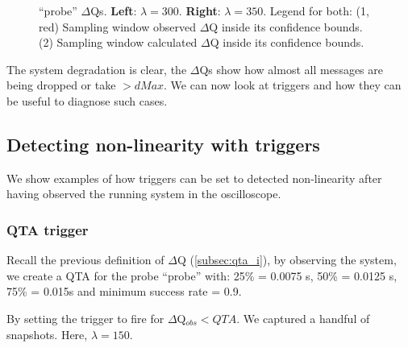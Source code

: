 \begin{figure}[H]
\begin{subfigure}{.5\textwidth}
                \label{fig:high_load_2}
            \end{subfigure}
            \caption{``probe'' $\Delta$Qs. \textbf{Left}: $\lambda = 300$. \textbf{Right}: $\lambda = 350$.  Legend for both: (1, red) Sampling window observed $\Delta$Q inside its confidence bounds. (2) Sampling window calculated $\Delta$Q inside its confidence bounds.}%
            \label{fig:hi_lo}%
        \end{figure}
    The system degradation is clear, the $\Delta$Qs show how almost all messages are being dropped or take $> dMax$. We can now look at triggers and how they can be useful to diagnose such cases.
  
    \subsection{Detecting non-linearity with triggers}
        We show examples of how triggers can be set to detected non-linearity after having observed the running system in the oscilloscope.

        \subsubsection{QTA trigger}
            Recall the previous definition of $\Delta$Q (\cref{subsec:qta_i}), by observing the system, we create a QTA for the probe ``probe'' with: 25\% = 0.0075 s, 50\% = 0.0125 s, 75\% = 0.015s and minimum success rate = 0.9.

            By setting the trigger to fire for $\Delta$Q$_{obs} < QTA$. We captured a handful of snapshots. Here, $\lambda = 150$.
        
